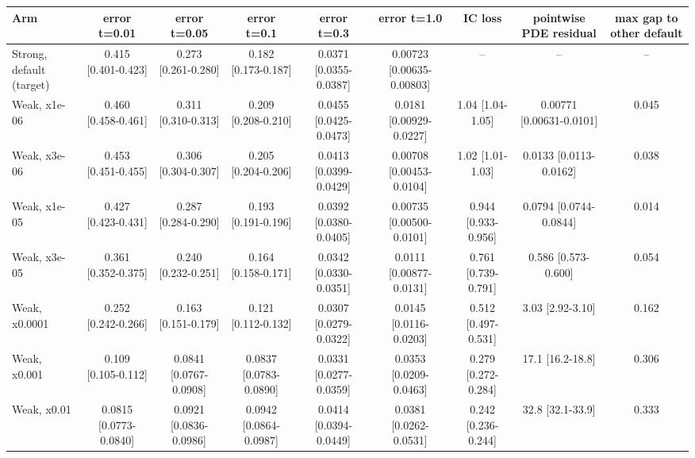 \begin{tabular}{lcccccccc}
\toprule
Arm & error t=0.01 & error t=0.05 & error t=0.1 & error t=0.3 & error t=1.0 & IC loss & pointwise PDE residual & max gap to other default \\
\midrule
Strong, default (target) & 0.415 {\scriptsize[0.401-0.423]} & 0.273 {\scriptsize[0.261-0.280]} & 0.182 {\scriptsize[0.173-0.187]} & 0.0371 {\scriptsize[0.0355-0.0387]} & 0.00723 {\scriptsize[0.00635-0.00803]} & -- & -- & -- \\
Weak, x1e-06 & 0.460 {\scriptsize[0.458-0.461]} & 0.311 {\scriptsize[0.310-0.313]} & 0.209 {\scriptsize[0.208-0.210]} & 0.0455 {\scriptsize[0.0425-0.0473]} & 0.0181 {\scriptsize[0.00929-0.0227]} & 1.04 {\scriptsize[1.04-1.05]} & 0.00771 {\scriptsize[0.00631-0.0101]} & 0.045 \\
Weak, x3e-06 & 0.453 {\scriptsize[0.451-0.455]} & 0.306 {\scriptsize[0.304-0.307]} & 0.205 {\scriptsize[0.204-0.206]} & 0.0413 {\scriptsize[0.0399-0.0429]} & 0.00708 {\scriptsize[0.00453-0.0104]} & 1.02 {\scriptsize[1.01-1.03]} & 0.0133 {\scriptsize[0.0113-0.0162]} & 0.038 \\
Weak, x1e-05 & 0.427 {\scriptsize[0.423-0.431]} & 0.287 {\scriptsize[0.284-0.290]} & 0.193 {\scriptsize[0.191-0.196]} & 0.0392 {\scriptsize[0.0380-0.0405]} & 0.00735 {\scriptsize[0.00500-0.0101]} & 0.944 {\scriptsize[0.933-0.956]} & 0.0794 {\scriptsize[0.0744-0.0844]} & 0.014 \\
Weak, x3e-05 & 0.361 {\scriptsize[0.352-0.375]} & 0.240 {\scriptsize[0.232-0.251]} & 0.164 {\scriptsize[0.158-0.171]} & 0.0342 {\scriptsize[0.0330-0.0351]} & 0.0111 {\scriptsize[0.00877-0.0131]} & 0.761 {\scriptsize[0.739-0.791]} & 0.586 {\scriptsize[0.573-0.600]} & 0.054 \\
Weak, x0.0001 & 0.252 {\scriptsize[0.242-0.266]} & 0.163 {\scriptsize[0.151-0.179]} & 0.121 {\scriptsize[0.112-0.132]} & 0.0307 {\scriptsize[0.0279-0.0322]} & 0.0145 {\scriptsize[0.0116-0.0203]} & 0.512 {\scriptsize[0.497-0.531]} & 3.03 {\scriptsize[2.92-3.10]} & 0.162 \\
Weak, x0.001 & 0.109 {\scriptsize[0.105-0.112]} & 0.0841 {\scriptsize[0.0767-0.0908]} & 0.0837 {\scriptsize[0.0783-0.0890]} & 0.0331 {\scriptsize[0.0277-0.0359]} & 0.0353 {\scriptsize[0.0209-0.0463]} & 0.279 {\scriptsize[0.272-0.284]} & 17.1 {\scriptsize[16.2-18.8]} & 0.306 \\
Weak, x0.01 & 0.0815 {\scriptsize[0.0773-0.0840]} & 0.0921 {\scriptsize[0.0836-0.0986]} & 0.0942 {\scriptsize[0.0864-0.0987]} & 0.0414 {\scriptsize[0.0394-0.0449]} & 0.0381 {\scriptsize[0.0262-0.0531]} & 0.242 {\scriptsize[0.236-0.244]} & 32.8 {\scriptsize[32.1-33.9]} & 0.333 \\

\end{tabular}
